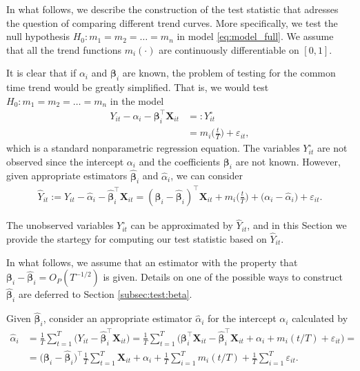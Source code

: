 \documentclass[a4paper,12pt]{article}
\begin{document}
In what follows, we describe the construction of the test statistic that adresses the question of comparing different trend curves. More specifically, we test the null hypothesis $H_0: m_1 = m_2 = \ldots = m_n$ in model \eqref{eq:model_full}. We assume that all the trend functions $m_i(\cdot)$ are continuously differentiable on $[0, 1]$.

It is clear that if $\alpha_i$ and $\bm{\beta}_i$ are known, the problem of testing for the common time trend would be greatly simplified. That is, we would test $H_0: m_1 = m_2 = \ldots = m_n$ in the model
\begin{align*}
Y_{it} - \alpha_i - \bm{\beta}_i^\top \mathbf{X}_{it} & =: Y_{it}^\circ\\
					& = m_i \Big( \frac{t}{T} \Big) + \varepsilon_{it}, 
\end{align*}
which is a standard nonparametric regression equation. The variables $Y_{it}^\circ$ are not observed since the intercept $\alpha_i$ and the coefficients $\bm{\beta}_i$ are not known. However, given appropriate estimators $\widehat{\bm{\beta}}_i$ and $\widehat{\alpha}_i$, we can consider
\begin{align*}
	\widehat{Y}_{it} := Y_{it} -\widehat{\alpha}_i - \widehat{\bm{\beta}}_i^\top \mathbf{X}_{it} =(\bm{\beta}_i - \widehat{\bm{\beta}}_i)^\top \mathbf{X}_{it} + m_i \Big( \frac{t}{T} \Big) + \big( \alpha_i - \widehat{\alpha}_i \big) + \varepsilon_{it}. 
\end{align*}

The unobserved variables $Y_{it}^\circ$ can be approximated by $\widehat{Y}_{it}$, and in this Section we provide the startegy for computing our test statistic based on $\widehat{Y}_{it}$.

In what follows, we assume that an estimator with the property that $\bm{\beta}_i - \widehat{\bm{\beta}}_i = O_P(T^{-1/2})$ is given.  Details on one of the possible ways to construct $\widehat{\bm{\beta}}_i$ are deferred to Section \ref{subsec:test:beta}.

Given $\widehat{\bm{\beta}}_i$, consider an appropriate estimator $\widehat{\alpha}_{i}$ for the intercept $\alpha_i$ calculated by
\begin{align}\label{alpha-est}
\widehat{\alpha}_i &= \frac{1}{T}\sum_{t=1}^T \big(Y_{it} - \widehat{\bm{\beta}}_i^\top \mathbf{X}_{it}\big) = \frac{1}{T}\sum_{t=1}^T \big(\bm{\beta}_i^\top \mathbf{X}_{it} - \widehat{\bm{\beta}}_i^\top \mathbf{X}_{it} + \alpha_i + m_i(t/T) + \varepsilon_{it}\big) =\\
&= \big(\bm{\beta}_i - \widehat{\bm{\beta}}_i \big)^\top\frac{1}{T}\sum_{t=1}^T  \mathbf{X}_{it} + \alpha_i + \frac{1}{T}\sum_{i=1}^T m_i(t/T) + \frac{1}{T}\sum_{i=1}^T \varepsilon_{it}.\nonumber
\end{align}
\end{document}
